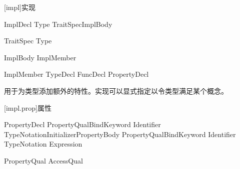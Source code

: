 
[impl]{实现}

\begin{bnf}{ImplDecl}
     Type TraitSpec\bnfq ImplBody
\end{bnf}

\begin{bnf}{TraitSpec}
    \terminal{:} Type
\end{bnf}

\begin{bnf}{ImplBody}
    \terminal{\{} ImplMember\bnfs \terminal{\}} \br
    \terminal{;}
    \terminal{=}  \terminal{;}
\end{bnf}

\begin{bnf}{ImplMember}
    TypeDecl \br
    FuncDecl \br
    PropertyDecl
\end{bnf}

\pnum
{}用于为类型添加额外的特性。实现可以显式指定以令类型满足某个概念。






[impl.prop]{属性}

\begin{bnf}{PropertyDecl}
    PropertyQual\bnfs BindKeyword Identifier TypeNotation\bnfq Initializer\bnfq PropertyBody \terminal{;} \br
    PropertyQual\bnfs BindKeyword Identifier TypeNotation\bnfq \terminal{=>} Expression \terminal{;}
\end{bnf}

\begin{bnf}{PropertyQual}
    AccessQual
\end{bnf}

